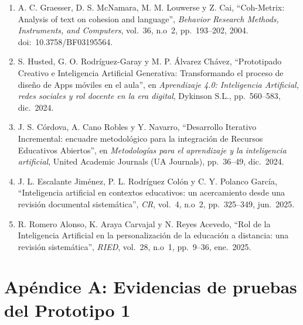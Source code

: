 \documentclass[11pt]{article}
\begin{document}
\begin{enumerate}
    \item A. C. Graesser, D. S. McNamara, M. M. Louwerse y Z. Cai, ``Coh-Metrix: Analysis of text on cohesion and language'', \textit{Behavior Research Methods, Instruments, and Computers}, vol.~36, n.o~2, pp.~193--202, 2004. doi:~10.3758/BF03195564.
    \item S. Husted, G. O. Rodríguez-Garay y M. P. Álvarez Chávez, ``Prototipado Creativo e Inteligencia Artificial Generativa: Transformando el proceso de diseño de Apps móviles en el aula'', en \textit{Aprendizaje 4.0: Inteligencia Artificial, redes sociales y rol docente en la era digital}, Dykinson S.L., pp.~560--583, dic.~2024.
    \item J. S. Córdova, A. Cano Robles y Y. Navarro, ``Desarrollo Iterativo Incremental: encuadre metodológico para la integración de Recursos Educativos Abiertos'', en \textit{Metodologías para el aprendizaje y la inteligencia artificial}, United Academic Journals (UA Journals), pp.~36--49, dic.~2024.
    \item J. L. Escalante Jiménez, P. L. Rodríguez Colón y C. Y. Polanco García, ``Inteligencia artificial en contextos educativos: un acercamiento desde una revisión documental sistemática'', \textit{CR}, vol.~4, n.o~2, pp.~325--349, jun.~2025.
    \item R. Romero Alonso, K. Araya Carvajal y N. Reyes Acevedo, ``Rol de la Inteligencia Artificial en la personalización de la educación a distancia: una revisión sistemática'', \textit{RIED}, vol.~28, n.o~1, pp.~9--36, ene.~2025.
\end{enumerate}


\clearpage
\section*{Apéndice A: Evidencias de pruebas del Prototipo 1}
\end{document}

